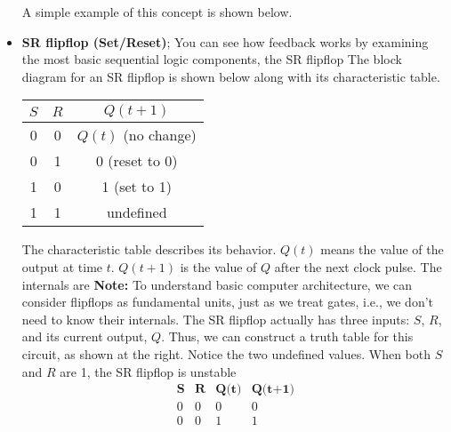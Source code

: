 \documentclass{report}
\begin{document}
\begin{itemize}
            \bigbreak \noindent 
            A simple example of this concept is shown below.
        \item \textbf{SR flipflop (Set/Reset)}; You can see how feedback works by examining the most basic sequential logic components, the SR flipflop
            \bigbreak \noindent 
            The block diagram for an SR flipflop is shown below along with its characteristic table.
            \bigbreak \noindent 
            \bigbreak \noindent 
            \begin{center}
                \begin{tabular}{cc|c}
                    $S$&$R$&$Q(t+1)$ \\ 
                    \hline
                    0 & 0 & $Q(t)$ (no change) \\
                    0 & 1 & 0 (reset to 0)\\ 
                    1 & 0 & 1 (set to 1)\\
                    1 & 1 & undefined
                \end{tabular}
            \end{center}
            \bigbreak \noindent 
            The characteristic table describes its behavior. 
            \bigbreak \noindent 
            $Q(t)$ means the value of the output at time $t$. $Q(t+1)$ is the value of $Q$ after the next clock pulse.
            \bigbreak \noindent 
            The internals are
            \bigbreak \noindent 
            \bigbreak \noindent 
            \textbf{Note:} To understand basic computer architecture, we can consider flipflops as fundamental units, just as we treat gates, i.e., we don’t need to know their internals.
            \bigbreak \noindent 
            The SR flipflop actually has three inputs: $S$, $R $, and its current output, $Q$.
            \bigbreak \noindent 
            Thus, we can construct a truth table for this circuit, as shown at the right.
            \bigbreak \noindent 
            Notice the two undefined values. When both $S$ and $R$ are 1, the SR flipflop is unstable
            \bigbreak \noindent 
            \[
                \begin{array}{|c|c|c||c|}
                    \hline
                    \textbf{S} & \textbf{R} & \textbf{Q(t)} & \textbf{Q(t+1)} \\
                    \hline
                    0 & 0 & 0 & 0 \\
                    0 & 0 & 1 & 1 \\

\end{array}\]
\end{itemize}
\end{document}
